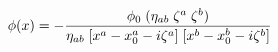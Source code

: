\begin{equation}
\phi(x) = - 
{\phi_0 \; (\eta_{ab} \; \zeta^a \; \zeta^b)
\over
\eta_{ab} \;[x^a-x_0^a-i\zeta^a] \; [x^b-x_0^b-i \zeta^b]
}
\label{E:mother}
\end{equation}

